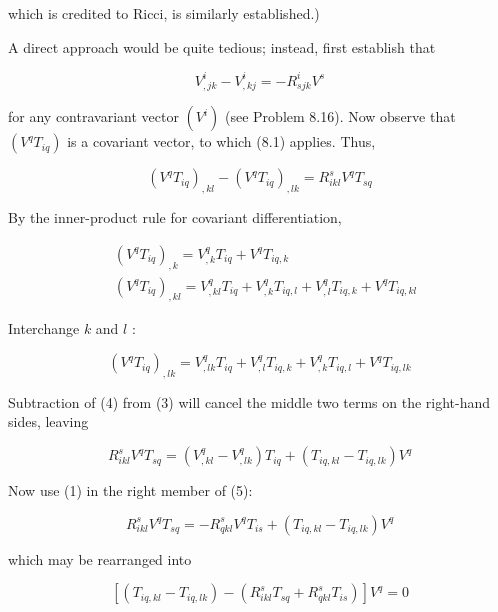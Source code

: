 \documentclass[10pt]{article}
\begin{document}
which is credited to Ricci, is similarly established.)

A direct approach would be quite tedious; instead, first establish that


\begin{equation*}
V_{, j k}^{i}-V_{, k j}^{i}=-R_{s j k}^{i} V^{s} \tag{1}
\end{equation*}


for any contravariant vector $\left(V^{i}\right)$ (see Problem 8.16). Now observe that $\left(V^{q} T_{i q}\right)$ is a covariant vector, to which (8.1) applies. Thus,


\begin{equation*}
\left(V^{q} T_{i q}\right)_{, k l}-\left(V^{q} T_{i q}\right)_{, l k}=R_{i k l}^{s} V^{q} T_{s q} \tag{2}
\end{equation*}


By the inner-product rule for covariant differentiation,


\begin{align*}
& \left(V^{q} T_{i q}\right)_{, k}=V_{, k}^{q} T_{i q}+V^{q} T_{i q, k}  \tag{3}\\
& \left(V^{q} T_{i q}\right)_{, k l}=V_{, k l}^{q} T_{i q}+V_{, k}^{q} T_{i q, l}+V_{, l}^{q} T_{i q, k}+V^{q} T_{i q, k l}
\end{align*}


Interchange $k$ and $l$ :


\begin{equation*}
\left(V^{q} T_{i q}\right)_{, l k}=V_{, l k}^{q} T_{i q}+V_{, l}^{q} T_{i q, k}+V_{, k}^{q} T_{i q, l}+V^{q} T_{i q, l k} \tag{4}
\end{equation*}


Subtraction of (4) from (3) will cancel the middle two terms on the right-hand sides, leaving


\begin{equation*}
R_{i k l}^{s} V^{q} T_{s q}=\left(V_{, k l}^{q}-V_{, l k}^{q}\right) T_{i q}+\left(T_{i q, k l}-T_{i q, l k}\right) V^{q} \tag{5}
\end{equation*}


Now use (1) in the right member of (5):

$$
R_{i k l}^{s} V^{q} T_{s q}=-R_{q k l}^{s} V^{q} T_{i s}+\left(T_{i q, k l}-T_{i q, l k}\right) V^{q}
$$

which may be rearranged into

$$
\left[\left(T_{i q, k l}-T_{i q, l k}\right)-\left(R_{i k l}^{s} T_{s q}+R_{q k l}^{s} T_{i s}\right)\right] V^{q}=0
$$
\end{document}
